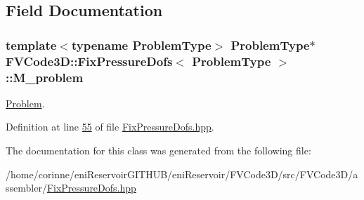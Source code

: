 \subsection{Field Documentation}
\subsubsection[{\texorpdfstring{M\+\_\+problem}{M_problem}}]{\setlength{\rightskip}{0pt plus 5cm}template$<$typename Problem\+Type$>$ Problem\+Type$\ast$ {\bf F\+V\+Code3\+D\+::\+Fix\+Pressure\+Dofs}$<$ Problem\+Type $>$\+::M\+\_\+problem\hspace{0.3cm}{\ttfamily [private]}}\hypertarget{classFVCode3D_1_1FixPressureDofs_ab62654a9bac382fc13e5e3da2a77532b}{}\label{classFVCode3D_1_1FixPressureDofs_ab62654a9bac382fc13e5e3da2a77532b}


\hyperlink{classFVCode3D_1_1Problem}{Problem}. 



Definition at line \hyperlink{FixPressureDofs_8hpp_source_l00055}{55} of file \hyperlink{FixPressureDofs_8hpp_source}{Fix\+Pressure\+Dofs.\+hpp}.



The documentation for this class was generated from the following file\+:\begin{DoxyCompactItemize}
\item 
/home/corinne/eni\+Reservoir\+G\+I\+T\+H\+U\+B/eni\+Reservoir/\+F\+V\+Code3\+D/src/\+F\+V\+Code3\+D/assembler/\hyperlink{FixPressureDofs_8hpp}{Fix\+Pressure\+Dofs.\+hpp}\end{DoxyCompactItemize}
